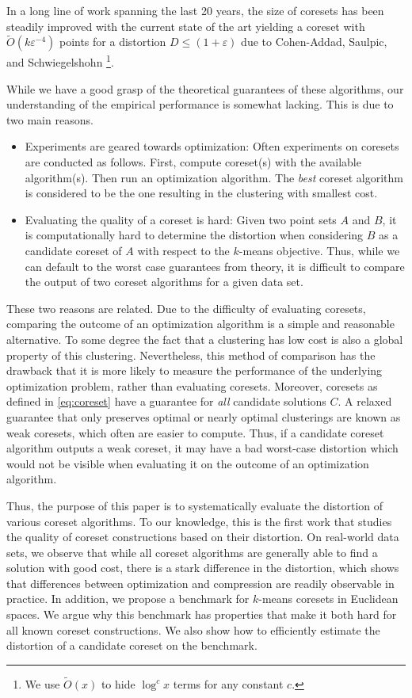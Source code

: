 In a long line of work spanning the last 20 years\cite{BecchettiBC0S19,BravermanJKW21,Chen09,FL11,FeldmanSS20,
HaM04,HaK07,huang2020coresets,BravermanJKW21,LS10,SohlerW18}, the size of coresets has been steadily improved with the current state of the art yielding a coreset with $\tilde{O}(k\varepsilon^{-4})$ points for a distortion $D\leq (1+\varepsilon)$ due to Cohen-Addad, Saulpic, and Schwiegelshohn \cite{Cohen-AddadSS21}\footnote{We use $\tilde O(x)$ to hide $\log^c x$ terms for any constant $c$.}.

While we have a good grasp of the theoretical guarantees of these algorithms, our understanding of the empirical performance is somewhat lacking.
This is due to two main reasons.
\begin{itemize}
\item Experiments are geared towards optimization: Often experiments on coresets are conducted as follows. First, compute coreset(s) with the available algorithm(s). Then run an optimization algorithm. The \emph{best} coreset algorithm is considered to be the one resulting in the clustering with smallest cost. 
\item Evaluating the quality of a coreset is hard: Given two point sets $A$ and $B$, it is computationally hard to determine the distortion when considering $B$ as a candidate coreset of $A$ with respect to the $k$-means objective.  Thus, while we can default to the worst case guarantees from theory, it is difficult to compare the output of two coreset algorithms for a given data set. 
\end{itemize}

These two reasons are related. Due to the difficulty of evaluating coresets, comparing the outcome of an optimization algorithm is a simple and reasonable alternative. To some degree the fact that a clustering has low cost is also a global property of this clustering.
Nevertheless, this method of comparison has the drawback that it is more likely to measure the performance of the underlying optimization problem, rather than evaluating coresets. Moreover, coresets as defined in \cref{eq:coreset} have a guarantee for
\emph{all} candidate solutions $C$. A relaxed guarantee that only preserves optimal or nearly optimal clusterings are known as weak coresets, which often are easier to compute. Thus, if a candidate coreset algorithm outputs a weak coreset, it may have a bad worst-case distortion which would not be visible when evaluating it on the outcome of an optimization algorithm.

Thus, the purpose of this paper is to systematically evaluate the distortion of various coreset algorithms.
To our knowledge, this is the first work that studies the quality of coreset constructions based on their distortion.
On real-world data sets, we observe that while all coreset algorithms are generally able to find a solution with good cost, there is a stark difference in the distortion, which shows that differences between optimization and compression are readily observable in practice.
In addition, we propose a benchmark for $k$-means coresets in Euclidean spaces.
We argue why this benchmark has properties that make it both hard for all known coreset constructions. We also show how to efficiently estimate the distortion of a candidate coreset on the benchmark.
